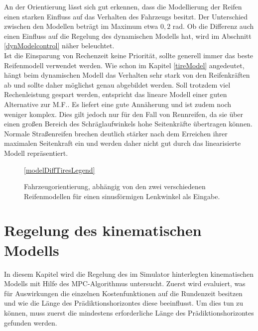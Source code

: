 \documentclass{like}
\begin{document}
An der Orientierung lässt sich gut erkennen, dass die Modellierung der Reifen einen starken Einfluss auf das Verhalten des Fahrzeugs besitzt. Der Unterschied zwischen den Modellen beträgt im Maximum etwa $0,2$ rad. 
Ob die Differenz auch einen Einfluss auf die Regelung des dynamischen Modells hat, wird im Abschnitt \ref{dynModelcontrol} näher beleuchtet. \\
Ist die Einsparung von Rechenzeit keine Priorität, sollte generell immer das beste Reifen\-mo\-dell verwendet werden. Wie schon im Kapitel \ref{tireModel} angedeutet, hängt beim dynamischen Modell das Verhalten sehr stark von den Reifenkräften ab und sollte daher möglichst genau abgebildet werden. Soll trotzdem viel Rechenleistung gespart werden, entspricht das lineare Modell einer guten Alternative zur \ac{M.F.}. Es liefert eine gute Annäherung und ist zudem noch weniger komplex. Dies gilt jedoch nur für den Fall von Rennreifen, da sie über einen großen Bereich des Schräglaufwinkels hohe Seitenkräfte übertragen können. Normale Straßenreifen brechen deutlich stärker nach dem Erreichen ihrer maximalen Seitenkraft ein und werden daher nicht gut durch das linearisierte Modell repräsentiert. 


\begin{figure}
	\centering
	 
	\ref{modelDiffTiresLegend}
	\caption{Fahrzeugorientierung, abhängig von den zwei verschiedenen Reifenmodellen für einen sinusförmigen Lenkwinkel als Eingabe.}
	\label{fig:modelDiffTires}
\end{figure}

\newpage
\section{Regelung des kinematischen Modells}
In diesem Kapitel wird die Regelung des im Simulator hinterlegten kinematischen Modells mit Hilfe des \ac{MPC}-Algorithmus untersucht. Zuerst wird evaluiert, was für Auswirkungen die einzelnen Kostenfunktionen auf die Rundenzeit besitzen und wie die Länge des Prädiktionshorizontes diese beeinflusst.
Um dies tun zu können, muss zuerst die mindestens erforderliche Länge des Prädiktionshorizontes gefunden werden. 
\end{document}
